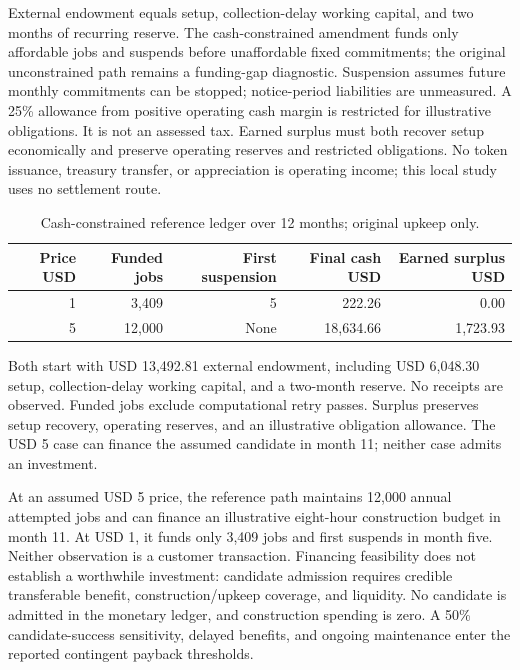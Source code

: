 External endowment equals setup, collection-delay working capital, and two
months of recurring reserve. The cash-constrained amendment funds only
affordable jobs and suspends before unaffordable fixed commitments; the
original unconstrained path remains a funding-gap diagnostic. Suspension
assumes future monthly commitments can be stopped; notice-period liabilities
are unmeasured. A 25\% allowance from positive operating cash margin is
restricted for illustrative obligations. It is not an assessed tax. Earned
surplus must both recover setup economically and preserve operating reserves
and restricted obligations. No token issuance, treasury transfer, or
appreciation is operating income; this local study uses no settlement route.

\begin{table}[tbp]
\centering\small
\caption{Cash-constrained reference ledger over 12 months; original upkeep only.}
\label{tab:ec-cash}
\begin{tabular}{rrrrr}
\toprule
Price USD & Funded jobs & First suspension & Final cash USD & Earned surplus USD \\
\midrule
1 & 3,409 & 5 & 222.26 & 0.00 \\
5 & 12,000 & None & 18,634.66 & 1,723.93 \\
\bottomrule
\end{tabular}
\par\smallskip\begin{minipage}{0.97\linewidth}\footnotesize Both start with USD 13,492.81 external endowment, including USD 6,048.30 setup, collection-delay working capital, and a two-month reserve. No receipts are observed. Funded jobs exclude computational retry passes. Surplus preserves setup recovery, operating reserves, and an illustrative obligation allowance. The USD 5 case can finance the assumed candidate in month 11; neither case admits an investment.
\end{minipage}
\end{table}


At an assumed USD 5 price, the reference path maintains 12,000 annual attempted
jobs and can finance an illustrative eight-hour construction budget in month
11. At USD 1, it funds only 3,409 jobs and first suspends in month five.
Neither observation is a customer transaction. Financing feasibility does not
establish a worthwhile investment: candidate admission requires credible
transferable benefit, construction/upkeep coverage, and liquidity. No
candidate is admitted in the monetary ledger, and construction spending is
zero. A 50\% candidate-success sensitivity, delayed benefits, and ongoing
maintenance enter the reported contingent payback thresholds.

